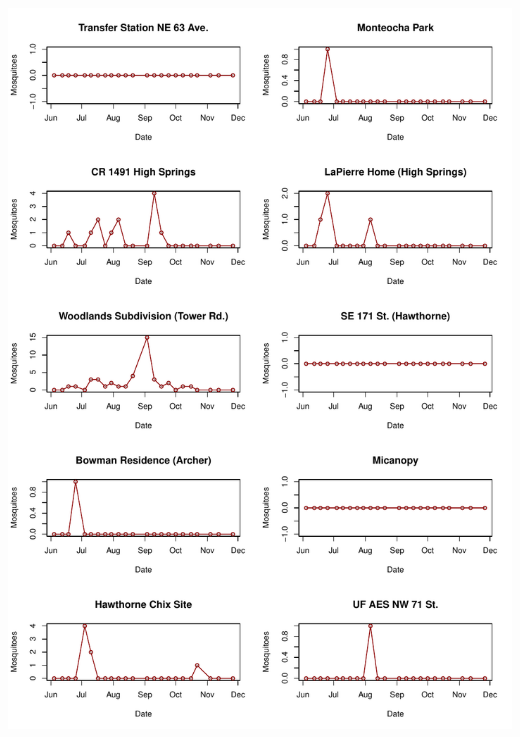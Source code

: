 \documentclass{article}
\begin{document}
\begin{center}
\includegraphics{mosq08nov13-013}

\end{center}
\end{document}

